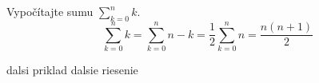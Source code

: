 \pr Vypočítajte sumu $\sum_{k=0}^n k$.
 $$\sum_{k=0}^n k = \sum_{k=0}^n n-k = \frac12 \sum_{k=0}^n n=\frac{n(n+1)}{2}$$

\pr dalsi priklad
 dalsie riesenie
